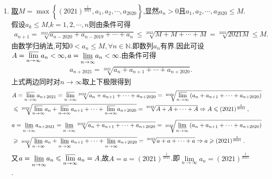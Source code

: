 \documentclass[../../main.tex]{subfiles}%
\begin{document}
\begin{solution}
\begin{enumerate}
\item \hyperref[example3.23-2]{取\(M=\max \left\{ \left( 2021 \right) ^{\frac{1}{2021}},a_1,a_2,\cdots ,a_{2020} \right\}\)},显然$a_n>0$且$a_1,a_2,\cdots ,a_{2020}\leqslant  M$.假设$a_k\leqslant  M$,$k=1,2,\cdots,n$则由条件可得
\begin{align*}
a_{n+1}=\sqrt[2022]{a_{n-2020}+a_{n-2019}+\cdots +a_{n}}\leqslant \sqrt[2022]{M+M+\cdots +M}=\sqrt[2022]{2021M}\leqslant M.
\end{align*}
由数学归纳法,可知$0<a_n\leqslant  M,\forall n\in\mathbb{N}$.即数列${a_n}$有界.因此可设$A=\underset{n\rightarrow \infty}{{\varlimsup }}a_n<\infty ,a=\underset{n\rightarrow \infty}{{\varliminf }}a_n<\infty$.由条件可得
\begin{align*}
a_{n+2021}=\sqrt[2022]{a_n+a_{n+1}+\cdots +a_{n+2020}}.
\end{align*}
上式两边同时对$n\to \infty$取上下极限得到
\begin{align*}
&A=\underset{n\rightarrow \infty}{{\varlimsup }}a_{n+2021}=\underset{n\rightarrow \infty}{{\varlimsup }}\sqrt[2022]{a_n+a_{n+1}+\cdots +a_{n+2020}}=\sqrt[2022]{\underset{n\rightarrow \infty}{{\varlimsup }}\left( a_n+a_{n+1}+\cdots +a_{n+2020} \right)}
\\
&\leqslant \sqrt[2022]{\underset{n\rightarrow \infty}{{\varlimsup }}a_n+\underset{n\rightarrow \infty}{{\varlimsup }}a_{n+1}+\cdots +\underset{n\rightarrow \infty}{{\varlimsup }}a_{n+2020}}=\sqrt[2022]{A+A+\cdots +A}\Rightarrow A\leqslant \left( 2021 \right) ^{\frac{1}{2021}},   
\end{align*}
\begin{align*}
&a=\underset{n\rightarrow \infty}{{\varliminf }}a_{n+2021}=\underset{n\rightarrow \infty}{{\varliminf }}\sqrt[2022]{a_n+a_{n+1}+\cdots +a_{n+2020}}=\sqrt[2022]{\underset{n\rightarrow \infty}{{\varliminf }}\left( a_n+a_{n+1}+\cdots +a_{n+2020} \right)}
\\
&\geqslant \sqrt[2022]{\underset{n\rightarrow \infty}{{\varliminf }}a_n+\underset{n\rightarrow \infty}{{\varliminf }}a_{n+1}+\cdots +\underset{n\rightarrow \infty}{{\varliminf }}a_{n+2020}}=\sqrt[2022]{a+a+\cdots +a}\Rightarrow a\geqslant \left( 2021 \right) ^{\frac{1}{2021}}.
\end{align*}
又$a=\underset{n\rightarrow \infty}{{\varliminf }}a_n\leqslant \underset{n\rightarrow \infty}{{\varlimsup }}a_n=A$,故$A=a=\left( 2021 \right) ^{\frac{1}{2021}}$.即$\underset{n\rightarrow \infty}{\lim}a_n=\left( 2021 \right) ^{\frac{1}{2021}}$.


\end{enumerate}
\end{solution}
\end{document}
